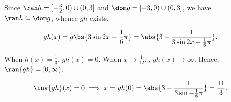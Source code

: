 \begin{solution}
\begin{ppart}
\begin{center}
        \end{center}
    \end{ppart}
    \begin{ppart}
        Since $\ran h = [-\frac32, 0) \cup (0, 3]$ and $\dom g = [-3, 0) \cup (0, 3]$, we have $\ran h \subseteq \dom g$, whence $gh$ exists.

        \[gh(x) = g\bs{3\sin{2x - \frac16\pi}} = \abs{3 - \frac1{3\sin{2x - \frac16\pi}}}.\]

        When $h(x) = \frac13$, $gh(x) = 0$. When $x \to \frac1{12} \pi$, $gh(x) \to \infty$. Hence, $\ran {gh} = [0, \infty)$.
    \end{ppart}
    \begin{ppart}
        \[\inv {gh}(x) = 0 \implies x = gh(0) = \abs{3 - \frac1{3\sin{-\frac16 \pi}}} = \frac{11}3.\]
    \end{ppart}
\end{solution}

